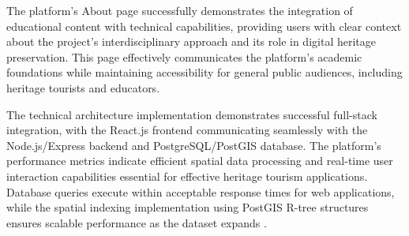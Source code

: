 
The platform's About page successfully demonstrates the integration of educational content with technical capabilities, providing users with clear context about the project's interdisciplinary approach and its role in digital heritage preservation. This page effectively communicates the platform's academic foundations while maintaining accessibility for general public audiences, including heritage tourists and educators.


The technical architecture implementation demonstrates successful full-stack integration, with the React.js frontend communicating seamlessly with the Node.js/Express backend and PostgreSQL/PostGIS database. The platform's performance metrics indicate efficient spatial data processing and real-time user interaction capabilities essential for effective heritage tourism applications. Database queries execute within acceptable response times for web applications, while the spatial indexing implementation using PostGIS R-tree structures ensures scalable performance as the dataset expands \cite{Guttman1984}.


